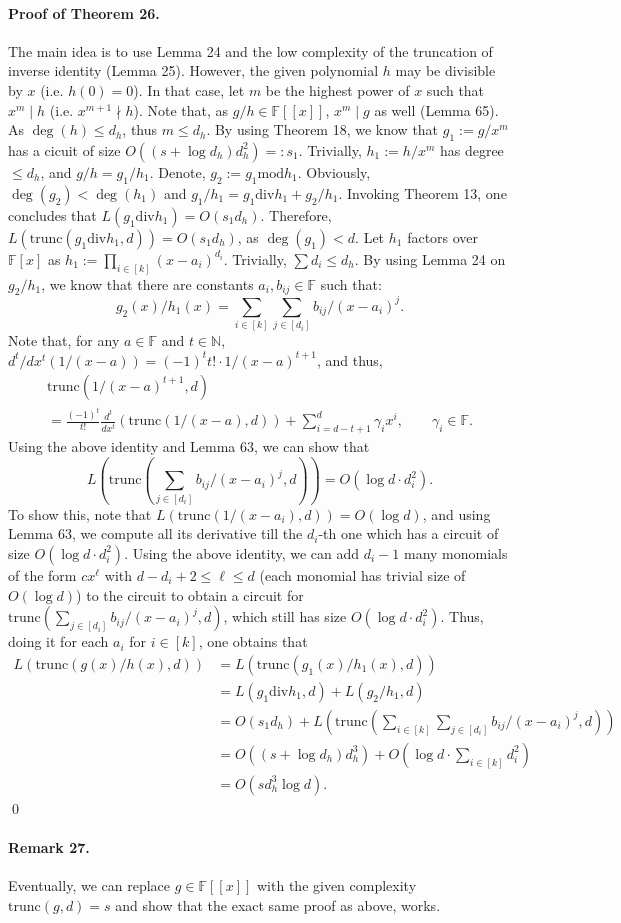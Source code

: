 \paragraph{Proof of Theorem 26.} The main idea is to use Lemma 24 and the low complexity of the truncation of inverse identity (Lemma 25). However, the given polynomial $h$ may be divisible by $x$ (i.e. $h(0)=0$). In that case, let $m$ be the highest power of $x$ such that $x^m\mid h$ (i.e. $x^{m+1}\nmid h$). Note that, as $g/h\in\mathbb F[[x]]$, $x^m\mid g$ as well (Lemma 65). As $\deg(h)\le d_h$, thus $m\le d_h$.
By using Theorem 18, we know that $g_1:=g/x^m$ has a cicuit of size $O((s+\log d_h)d_h^2)=:s_1$. Trivially, $h_1:=h/x^m$ has degree $\le d_h$, and $g/h=g_1/h_1$. Denote, $g_2:=g_1\mathbin{\mathrm{mod}}h_1$. Obviously, $\deg(g_2)<\deg(h_1)$ and $g_1/h_1=g_1\mathbin{\mathrm{div}}h_1+g_2/h_1$. Invoking Theorem 13, one concludes that $L(g_1\mathbin{\mathrm{div}}h_1)=O(s_1d_h)$. Therefore, $L(\mathrm{trunc}(g_1\mathbin{\mathrm{div}}h_1,d))=O(s_1d_h)$, as $\deg(g_1)<d$.
Let $h_1$ factors over $\mathbb F[x]$ as $h_1:=\prod_{i\in[k]}(x-a_i)^{d_i}$. Trivially, $\sum d_i\le d_h$. By using Lemma 24 on $g_2/h_1$, we know that there are constants $a_i,b_{ij}\in\mathbb F$ such that:
\[g_2(x)/h_1(x)=\sum_{i\in[k]}\sum_{j\in[d_i]}b_{ij}/(x-a_i)^j.\]
Note that, for any $a\in\mathbb F$ and $t\in\mathbb N$, $d^t/dx^t(1/(x-a))=(-1)^tt!\cdot1/(x-a)^{t+1}$, and thus,
\begin{multline*}\mathrm{trunc}(1/(x-a)^{t+1},d)\\=\frac{(-1)^t}{t!}\frac{d^t}{dx^t}(\mathrm{trunc}(1/(x-a),d))+\sum_{i=d-t+1}^d\gamma_ix^i,\qquad\gamma_i\in\mathbb F.\end{multline*}
Using the above identity and Lemma 63, we can show that
\[L\left(\mathrm{trunc}\left(\sum_{j\in[d_i]}b_{ij}/(x-a_i)^j,d\right)\right)=O(\log d\cdot d_i^2).\]
To show this, note that $L(\mathrm{trunc}(1/(x-a_i),d))=O(\log d)$, and using Lemma 63, we compute all its derivative till the $d_i$-th one which has a circuit of size $O(\log d\cdot d_i^2)$. Using the above identity, we can add $d_i-1$ many monomials of the form $cx^\ell$ with $d-d_i+2\le\ell\le d$ (each monomial has trivial size of $O(\log d)$) to the circuit to obtain a circuit for $\mathrm{trunc}(\sum_{j\in[d_i]}b_{ij}/(x-a_i)^j,d)$, which still has size $O(\log d\cdot d_i^2)$. Thus, doing it for each $a_i$ for $i\in[k]$, one obtains that
\begin{align*}L(\mathrm{trunc}(g(x)/h(x),d))&=L(\mathrm{trunc}(g_1(x)/h_1(x),d))\\&=L(g_1\mathbin{\mathrm{div}}h_1,d)+L(g_2/h_1,d)\\&=O(s_1d_h)+L\left(\mathrm{trunc}\left(\sum_{i\in[k]}\sum_{j\in[d_i]}b_{ij}/(x-a_i)^j,d\right)\right)\\&=O((s+\log d_h)d_h^3)+O\left(\log d\cdot\sum_{i\in[k]}d_i^2\right)\\&=O(sd_h^3\log d).\end{align*}\qed
\paragraph{Remark 27.} Eventually, we can replace $g\in\mathbb F[[x]]$ with the given complexity $\mathrm{trunc}(g,d)=s$ and show that the exact same proof as above, works.
